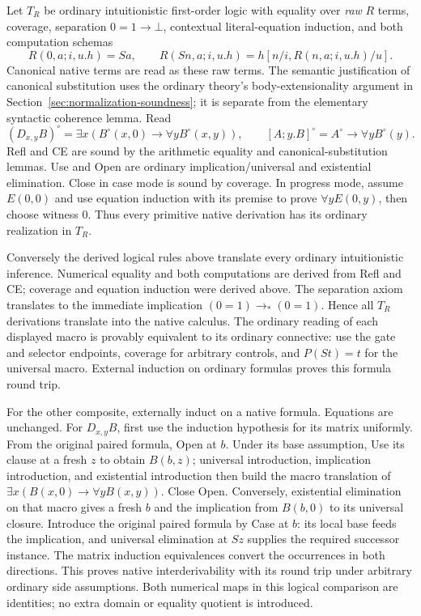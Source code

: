 \documentclass[10pt,letterpaper]{article}
\theoremstyle{definition}
\theoremstyle{remark}
\begin{document}
Let $T_R$ be ordinary intuitionistic first-order logic with equality over
\emph{raw} $R$ terms, coverage, separation $0=1\to\bot$, contextual
literal-equation induction, and both computation schemas
\[
 R(0,a;i,u.h)=Sa,\qquad
 R(Sn,a;i,u.h)=h[n/i,R(n,a;i,u.h)/u].
\]
Canonical native terms are read as these raw terms. The semantic
justification of canonical substitution uses the ordinary theory's
body-extensionality argument in Section~\ref{sec:normalization-soundness};
it is separate from the elementary syntactic coherence lemma. Read
\[
 (D_{x,y}B)^\circ=\exists x(B^\circ(x,0)\to\forall yB^\circ(x,y)),
 \qquad [A;y.B]^\circ=A^\circ\to\forall yB^\circ(y).
\]
Refl and CE are sound by the arithmetic equality and canonical-substitution
lemmas. Use and Open are ordinary implication/universal and existential
elimination. Close in case mode is sound by coverage. In progress mode,
assume $E(0,0)$ and use equation induction with its premise to prove
$\forall yE(0,y)$, then choose witness $0$. Thus every primitive native
derivation has its ordinary realization in $T_R$.

Conversely the derived logical rules above translate every ordinary
intuitionistic inference. Numerical equality and both computations are
derived from Refl and CE; coverage and equation induction were derived
above. The separation axiom translates to the immediate implication
$(0=1)\to_*(0=1)$. Hence all $T_R$ derivations translate into the native
calculus. The ordinary reading of each displayed macro is provably
equivalent to its ordinary connective: use the gate and selector endpoints,
coverage for arbitrary controls, and $P(St)=t$ for the universal macro.
External induction on ordinary formulas proves this formula round trip.

For the other composite, externally induct on a native formula. Equations
are unchanged. For $D_{x,y}B$, first use the induction hypothesis for its
matrix uniformly. From the original paired formula, Open at $b$. Under
its base assumption, Use its clause at a fresh $z$ to obtain $B(b,z)$;
universal introduction, implication introduction, and existential
introduction then build the macro translation of
$\exists x(B(x,0)\to\forall yB(x,y))$. Close Open.
Conversely, existential elimination on that macro gives a fresh $b$ and
the implication from $B(b,0)$ to its universal closure. Introduce the
original paired formula by Case at $b$: its local base feeds the implication,
and universal elimination at $Sz$ supplies the required successor instance.
The matrix induction equivalences convert the occurrences in both directions.
This proves native interderivability with its round trip under arbitrary
ordinary side assumptions. Both numerical maps in this logical comparison
are identities; no extra domain or equality quotient is introduced.
\end{document}
